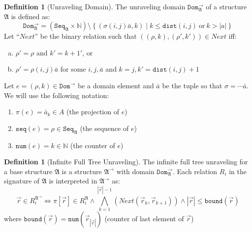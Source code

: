 \documentclass[draft]{scrartcl}
\theoremstyle{definition}
\newtheorem{definition}[theorem]{Definition}
\newcommand{\struct}[1]{\mathfrak{#1}}
\newcommand{\seqset}[1]{\mathtt{Seq}_{#1}}
\newcommand{\seq}[1]{\mathtt{seq}({#1})}
\newcommand{\num}[1]{\mathtt{num}({#1})}
\newcommand{\dist}[2]{\mathtt{dist}({#1},{#2})}
\newcommand{\nextrel}[2]{\mathit{Next}({#1},{#2})}
\begin{document}
\begin{definition}[Unraveling Domain]
  The unraveling domain $\mathtt{Dom}^{\rightarrow}_{\struct{A}}$ of a structure $\struct{A}$ is defined as:
  \begin{equation*}
    \mathtt{Dom}^{\rightarrow}_{\struct{A}}
      = (\seqset{\struct{A}} \times \mathbb{N})
        \setminus
        \left\{ (\sigma(i,j)\bar{a}, k) \mid k \le \dist{i}{j}\ \text{or}\ k > |a| \right\}
  \end{equation*}
  Let ``$\mathit{Next}$'' be the binary relation such that $((\rho, k), (\rho', k')) \in \mathit{Next}$ iff:
  \begin{enumerate}[(a)]
    \item $\rho' = \rho$ and $k' = k + 1'$, or
    \item $\rho' = \rho (i,j) \bar{a}$ for some $i, j, \bar{a}$ and $k = j, k' = \dist{i}{j} + 1$
  \end{enumerate}
  Let $e = (\rho, k) \in \mathtt{Dom}^{\rightarrow}$ be a domain element and $\bar{a}$ be the tuple so that $\sigma = \cdots{}\bar{a}$.
  We will use the following notation:
  \begin{enumerate}
    \item $\pi(e) = \bar{a}_{k} \in A$ (the projection of $e$)
    \item $\seq{e} = \rho \in \seqset{\struct{A}}$ (the sequence of $e$)
    \item $\num{e} = k \in \mathbb{N}$ (the counter of $e$)
  \end{enumerate}
\end{definition}


\begin{definition}[Infinite Full Tree Unraveling]
  The infinite full tree unraveling for a base structure $\struct{A}$ is a structure $\struct{A}^{\rightarrow{}}$ with domain $\mathtt{Dom}^{\rightarrow}_{\struct{A}}$.
  Each relation $R_{i}$ in the signature of $\struct{A}$ is interpreted in $\struct{A}^{\rightarrow}$ as:
  \begin{equation*}
    \overrightarrow{r} \in R_{i}^{\struct{A}^{\rightarrow}} \iff \pi[\overrightarrow{r}] \in R_{i}^{\struct{A}} \land \bigwedge_{k=1}^{|\overrightarrow{r}|-1}{(\nextrel{\overrightarrow{r}_{k}}{\overrightarrow{r}_{k+1}})} \land |\overrightarrow{r}| \le \mathtt{bound}(\overrightarrow{r})
  \end{equation*}
  where $\mathtt{bound}(\overrightarrow{r}) = \num{\overrightarrow{r}_{|\overrightarrow{r}|}}$ (counter of last element of $\overrightarrow{r}$)
\end{definition}
\end{document}
